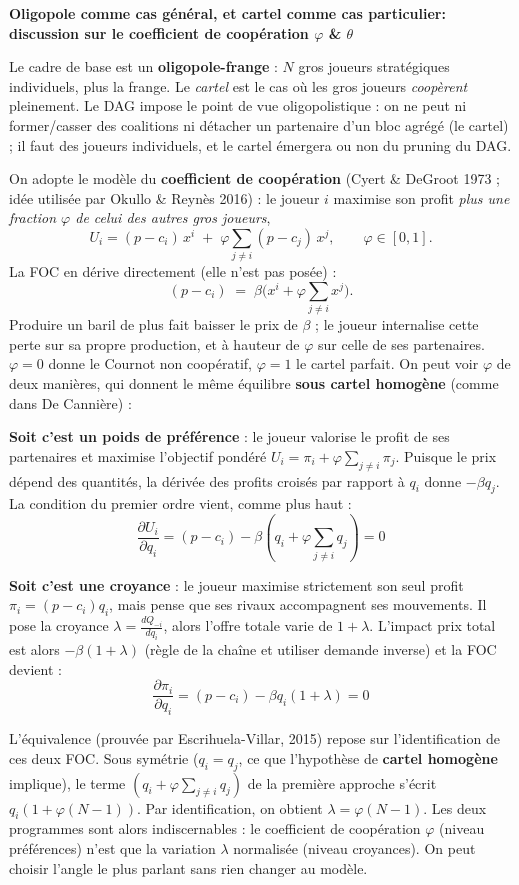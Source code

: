 \documentclass[11pt]{article}
\begin{document}
\textbf{Oligopole comme cas général, et cartel comme cas particulier: discussion sur le coefficient de coopération $\varphi$ \& $\theta$}

Le cadre de base est un \textbf{oligopole-frange} : $N$ gros joueurs stratégiques individuels, plus la frange. Le \emph{cartel} est le cas où les gros joueurs \emph{coopèrent} pleinement. Le DAG impose le point de vue oligopolistique : on ne peut ni former/casser des coalitions ni détacher un partenaire d'un bloc agrégé (le cartel) ; il faut des joueurs individuels, et le cartel émergera ou non du pruning du DAG. 

On adopte le modèle du \textbf{coefficient de coopération} (Cyert \& DeGroot 1973 ; idée utilisée par Okullo \& Reynès 2016) : le joueur $i$ maximise son profit \emph{plus une fraction $\varphi$ de celui des autres gros joueurs},
\[
U_i = (p-c_i)\,x^i \;+\; \varphi \sum_{j\neq i} (p-c_j)\,x^j, \qquad \varphi\in[0,1].
\]
La FOC en dérive directement (elle n'est pas posée) :
\[
(p-c_i) \;=\; \beta\Big( x^i + \varphi \sum_{j\neq i} x^j \Big).
\]
Produire un baril de plus fait baisser le prix de $\beta$ ; le joueur internalise cette perte sur sa propre production, et à hauteur de $\varphi$ sur celle de ses partenaires. $\varphi=0$ donne le Cournot non coopératif, $\varphi=1$ le cartel parfait. On peut voir $\varphi$ de deux manières, qui donnent le même équilibre \textbf{sous cartel homogène} (comme dans De Cannière) : 

\textbf{Soit c'est un poids de préférence} : le joueur valorise le profit de ses partenaires et maximise l'objectif pondéré $U_i = \pi_i + \varphi \sum_{j \neq i} \pi_j$. Puisque le prix dépend des quantités, la dérivée des profits croisés par rapport à $q_i$ donne $-\beta q_j$. La condition du premier ordre vient, comme plus haut : 
$$ \frac{\partial U_i}{\partial q_i} = (p - c_i) - \beta \left(q_i + \varphi \sum_{j \neq i} q_j \right) = 0 $$

\textbf{Soit c'est une croyance} : le joueur maximise strictement son seul profit $\pi_i = (p - c_i)q_i$, mais pense que ses rivaux accompagnent ses mouvements. Il pose la croyance $\lambda = \frac{dQ_{-i}}{dq_i}$, alors l'offre totale varie de $1+\lambda$. L'impact prix total est alors $-\beta(1+\lambda)$ (règle de la chaîne et utiliser demande inverse) et la FOC devient :
$$ \frac{\partial \pi_i}{\partial q_i} = (p - c_i) - \beta q_i(1+\lambda) = 0 $$

L'équivalence (prouvée par Escrihuela-Villar, 2015) repose sur l'identification de ces deux FOC. Sous symétrie ($q_i = q_j$, ce que l'hypothèse de \textbf{cartel homogène} implique), le terme $(q_i + \varphi \sum_{j \neq i} q_j)$ de la première approche s'écrit $q_i(1 + \varphi(N-1))$. Par identification, on obtient $\lambda = \varphi(N-1)$. Les deux programmes sont alors indiscernables : le coefficient de coopération $\varphi$ (niveau préférences) n'est que la variation $\lambda$ normalisée (niveau croyances). On peut choisir l'angle le plus parlant sans rien changer au modèle.
\end{document}
